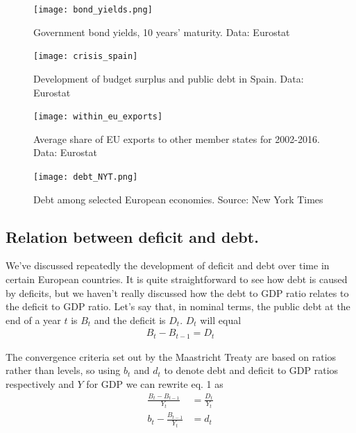 \documentclass{tufte-handout}
\begin{document}
\begin{figure} \centering
    \texttt{[image: bond\_yields.png]}
    \caption{Government bond yields, 10 years' maturity. Data: Eurostat}
    \label{fig:bonds}
  \end{figure}

\begin{figure}
  \texttt{[image: crisis\_spain]}
  \caption{Development of budget surplus and public debt in Spain. Data: Eurostat}
  \label{fig:spain}
\end{figure}

\begin{figure}
  \texttt{[image: within\_eu\_exports]}
  \caption{Average share of EU exports to other member states for 2002-2016. Data: Eurostat}
  \label{fig:exports}
\end{figure}

\begin{figure} \centering
    \texttt{[image: debt\_NYT.png]}
    \caption{Debt among selected European economies. Source: New York Times} 
    \label{fig:inter_debt}
\end{figure}
\clearpage
\subsection{Relation between deficit and debt.}
We've discussed repeatedly the development of deficit and debt over time in certain European countries. 
It is quite straightforward to see how debt is caused by deficits, but we haven't really discussed how the debt to GDP ratio relates to the deficit to GDP ratio. 
Let's say that, in nominal terms, the public debt at the end of a year $t$ is $B_t$ and the deficit is $D_t$. 
$D_t$ will equal
\begin{align}
  B_t-B_{t-1}=D_t
\end{align}

The convergence criteria set out by the Maastricht Treaty are based on ratios rather than levels, so using $b_t$ and $d_t$ to denote debt and deficit to GDP ratios respectively and $Y$ for GDP we can rewrite eq. 1 as
\begin{align}
  \frac{B_t-B_{t-1}}{Y_t} &= \frac{D_t}{Y_t}\\
  b_t-\frac{B_{t-1}}{Y_t} &= d_t
\end{align}
\end{document}
